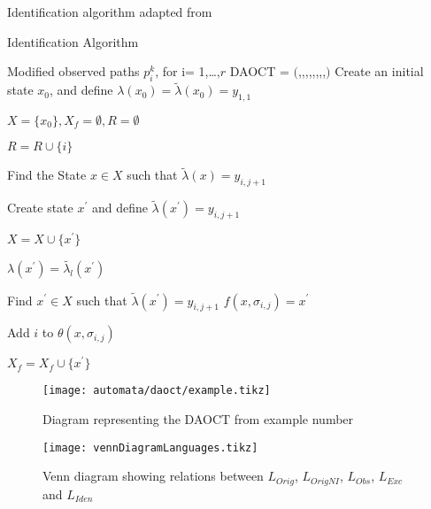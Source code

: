 Identification algorithm adapted from \cite{moreira2018enhanced}
\begin{algorithm2e}
  \caption{Identification Algorithm}\label{alg:identification}
\KwIn
{%
Modified observed paths $p_i^k$, for i= 1,\dots,$r$
}
\KwOut
{%
DAOCT = $($\XSet,\SigmaSet,\OmegaSet,\ffunction,\lambdafunction,\RSet,\thetafunction,\xZero,\XfSet$)$
}
\BlankLine
Create an initial state $x_0$, and define $\lambda(x_0) = \tilde{\lambda}(x_0) =
y_{1,1}$

$X = \{ x_0\}, X_f = \emptyset, R = \emptyset$

{
  $R = R \cup \{ i \}$
  
{
  Find the State $x \in X $ such that $\tilde{\lambda}(x) = y_{i,j+1}$

  { Create state $x^\prime$ and define $\tilde{\lambda}(x^\prime) = y_{i,j+1}$

$X = X \cup \{ x^\prime\}$

$\lambda(x^\prime) = \tilde{\lambda_l}(x^\prime)$

}
{
  Find $x^\prime \in X$ such that $\tilde{\lambda}(x^\prime) = y_{i,j+1}$
}
$f(x,\sigma_{i,j}) = x^\prime$

Add $i$ to $\theta(x,\sigma_{i,j})$

{
  $X_f = X_f \cup \{x^\prime\}$
}
}
}
\end{algorithm2e}



\begin{figure}[H]
  \centering
  \texttt{[image: automata/daoct/example.tikz]}
  \caption{Diagram representing the DAOCT from example number }
\end{figure}

\usetikzlibrary{patterns}
\begin{figure}[H]
  \centering
  \texttt{[image: vennDiagramLanguages.tikz]}
  \caption{Venn diagram showing relations between $L_{Orig}$, $L_{OrigNI}$,
    $L_{Obs}$, $L_{Exc}$ and $L_{Iden}$}
\end{figure}


